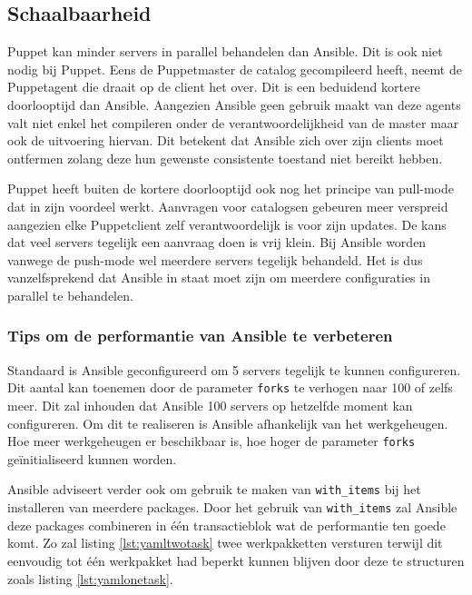 \subsection{Schaalbaarheid}
\label{sec:schaalbaarheid}

Puppet kan minder servers  in parallel behandelen dan Ansible. Dit is ook niet nodig bij Puppet. Eens de Puppetmaster de \gls{catalog} gecompileerd heeft, neemt de Puppetagent die draait op de client het over. Dit is een beduidend kortere doorlooptijd dan Ansible. Aangezien Ansible geen gebruik maakt van deze agents valt niet enkel het compileren onder de verantwoordelijkheid van de master maar ook de uitvoering hiervan. Dit betekent dat Ansible zich over zijn clients moet ontfermen zolang deze hun gewenste consistente toestand niet bereikt hebben.

Puppet heeft buiten de kortere doorlooptijd ook nog het principe van pull-mode dat in zijn voordeel werkt. Aanvragen voor \gls{catalog}sen gebeuren meer verspreid aangezien elke Puppetclient zelf verantwoordelijk is voor zijn updates. De kans dat veel servers tegelijk een aanvraag doen is vrij klein.  Bij Ansible worden vanwege de push-mode wel meerdere servers tegelijk behandeld. Het is dus vanzelfsprekend dat Ansible in staat moet zijn om meerdere configuraties in parallel te behandelen. 




 \subsubsection{Tips om de performantie van Ansible te verbeteren}
 
 Standaard is Ansible geconfigureerd om 5 servers tegelijk te kunnen configureren. Dit aantal kan toenemen door de parameter \texttt{\gls{fork}s} te verhogen naar 100 of zelfs meer. Dit zal inhouden dat Ansible 100 servers op hetzelfde moment kan configureren. Om dit te realiseren is Ansible afhankelijk van het werkgeheugen. Hoe meer werkgeheugen er beschikbaar is, hoe hoger de parameter \texttt{\gls{fork}s} ge\"initialiseerd kunnen worden.
 
Ansible adviseert verder ook om gebruik te maken van \texttt{with\_items} bij het installeren van meerdere packages. Door het gebruik van \texttt{with\_items} zal Ansible deze packages combineren in \'e\'en transactieblok wat de performantie ten goede komt. Zo zal listing \ref{lst:yamltwotask} twee \gls{werkpakket}ten versturen terwijl dit eenvoudig tot \'e\'en \gls{werkpakket}  had beperkt kunnen blijven door deze te structuren zoals listing \ref{lst:yamlonetask}.



